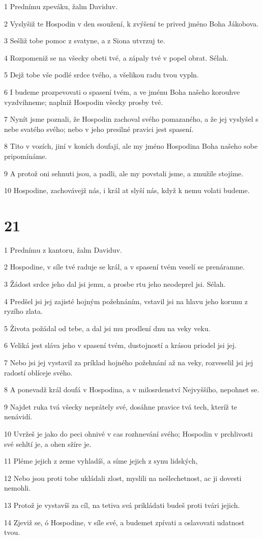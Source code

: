 \par 1 Prednímu zpeváku, žalm Daviduv.
\par 2 Vyslyšiž te Hospodin v den ssoužení, k zvýšení te prived jméno Boha Jákobova.
\par 3 Sešliž tobe pomoc z svatyne, a z Siona utvrzuj te.
\par 4 Rozpomeniž se na všecky obeti tvé, a zápaly tvé v popel obrat. Sélah.
\par 5 Dejž tobe vše podlé srdce tvého, a všelikou radu tvou vypln.
\par 6 I budeme prozpevovati o spasení tvém, a ve jménu Boha našeho korouhve vyzdvihneme; naplniž Hospodin všecky prosby tvé.
\par 7 Nynít jsme poznali, že Hospodin zachoval svého pomazaného, a že jej vyslyšel s nebe svatého svého; nebo v jeho presilné pravici jest spasení.
\par 8 Tito v vozích, jiní v koních doufají, ale my jméno Hospodina Boha našeho sobe pripomínáme.
\par 9 A protož oni sehnuti jsou, a padli, ale my povstali jsme, a zmužile stojíme.
\par 10 Hospodine, zachovávejž nás, i král at slyší nás, když k nemu volati budeme.

\chapter{21}

\par 1 Prednímu z kantoru, žalm Daviduv.
\par 2 Hospodine, v síle tvé raduje se král, a v spasení tvém veselí se prenáramne.
\par 3 Žádost srdce jeho dal jsi jemu, a prosbe rtu jeho neodeprel jsi. Sélah.
\par 4 Predšel jsi jej zajisté hojným požehnáním, vstavil jsi na hlavu jeho korunu z ryzího zlata.
\par 5 Života požádal od tebe, a dal jsi mu prodlení dnu na veky veku.
\par 6 Veliká jest sláva jeho v spasení tvém, dustojností a krásou priodel jsi jej.
\par 7 Nebo jsi jej vystavil za príklad hojného požehnání až na veky, rozveselil jsi jej radostí oblíceje svého.
\par 8 A ponevadž král doufá v Hospodina, a v milosrdenství Nejvyššího, nepohnet se.
\par 9 Najdet ruka tvá všecky neprátely své, dosáhne pravice tvá tech, kteríž te nenávidí.
\par 10 Uvržeš je jako do peci ohnivé v cas rozhnevání svého; Hospodin v prchlivosti své sehltí je, a ohen sžíre je.
\par 11 Pléme jejich z zeme vyhladíš, a síme jejich z synu lidských,
\par 12 Nebo jsou proti tobe ukládali zlost, myslili na nešlechetnost, ac ji dovesti nemohli.
\par 13 Protož je vystavíš za cíl, na tetiva svá prikládati budeš proti tvári jejich.
\par 14 Zjeviž se, ó Hospodine, v síle své, a budemet zpívati a oslavovati udatnost tvou.

